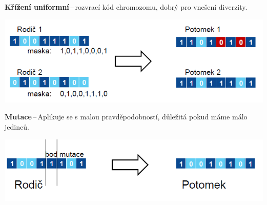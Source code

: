 \textbf{Křížení uniformní}\,--\,rozvrací kód chromozomu, dobrý pro vnešení diverzity.

\begin{center}
\includegraphics[scale=0.7]{BPC-TIN/images/uniform.PNG}
\end{center}

\textbf{Mutace}\,--\,Aplikuje se s malou pravděpodobností, důležitá pokud máme málo jedinců.

\begin{center}
\includegraphics[scale=0.7]{BPC-TIN/images/mutace.PNG}
\end{center}